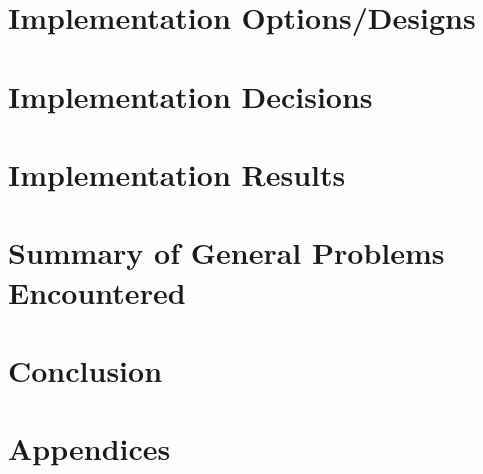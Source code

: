 \documentclass[12pt]{report}
\begin{document}
\section{Implementation Options/Designs}

\newpage

\section{Implementation Decisions}

\newpage


\section{Implementation Results}

\newpage


\section{Summary of General Problems Encountered}




\section{Conclusion}

\newpage



\section{Appendices}


\newpage
\end{document}
